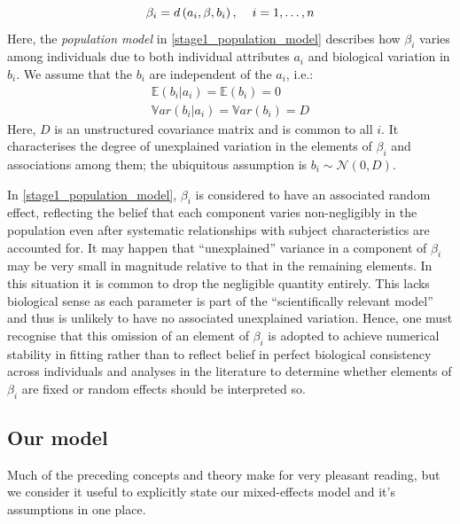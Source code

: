 \documentclass[11pt]{article} %
\begin{document}
\begin{equation} \label{stage1_population_model}
\beta_i = d\left(a_i,\beta,b_i\right), \hspace{4mm} i = 1,\ldots,n
\end{equation}
Here, the \emph{population model} in \eqref{stage1_population_model} describes how $\beta_i$ varies among individuals due to both individual attributes $a_i$ and biological variation in $b_i$. We assume that the $b_i$ are independent of the $a_i$, i.e.:
\begin{equation}
\begin{array}{l}
\mathbb{E}(b_i|a_i) = \mathbb{E}(b_i) = 0 \\
\mathbb{V}ar(b_i|a_i) = \mathbb{V}ar(b_i) = D
\end{array}
\end{equation}
Here, $D$ is an unstructured covariance matrix and is common to all $i$. It characterises the degree of unexplained variation in the elements of $\beta_i$ and associations among them; the ubiquitous assumption is $b_i \sim \mathcal{N}(0,D)$.


In \eqref{stage1_population_model}, $\beta_i$ is considered to have an associated random effect, reflecting the belief that each component varies non-negligibly in the population even after systematic relationships with subject characteristics are accounted for. It may happen that ``unexplained'' variance in a component of $\beta_i$ may be very small in magnitude relative to that in the remaining elements. In this situation it is common to drop the negligible quantity entirely. This lacks biological sense as each parameter is part of the ``scientifically relevant model'' and thus is unlikely to have no associated unexplained variation. Hence, one must recognise that this omission of an element of $\beta_i$ is adopted to achieve numerical stability in fitting rather than to reflect belief in perfect biological consistency across individuals and analyses in the literature to determine whether elements of $\beta_i$ are fixed or random effects should be interpreted so.

\subsection{Our model} \label{subsect_model}
Much of the preceding concepts and theory make for very pleasant reading, but we consider it useful to explicitly state our mixed-effects model and it's assumptions in one place.
\end{document}
